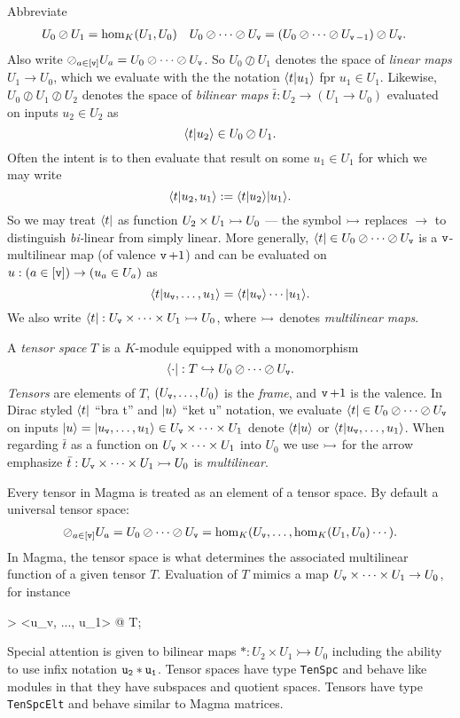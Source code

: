 \documentclass{documentation}
\begin{document}
Abbreviate 
\begin{align*}
   U_0\oslash U_1 & = \hom_K(U_1,U_0)
   &
   U_0\oslash\cdots \oslash U_{\operatorname{\mathtt{v}}} & = (U_0\oslash\cdots\oslash U_{\operatorname{\mathtt{v}}-1})\oslash U_{\operatorname{\mathtt{v}}}.
\end{align*}
Also write $\oslash_{a\in[\operatorname{\mathtt{v}}]} U_a=U_0\oslash\cdots\oslash
U_{\operatorname{\mathtt{v}}}$.  So $U_0\oslash U_1$ denotes the space of \emph{linear maps} $U_1\to U_0$,
which we evaluate with the the notation $\langle t|u_1\rangle$ fpr $u_1\in U_1$.
Likewise, $U_0\oslash U_1\oslash U_2$ denotes the space of \emph{bilinear maps} 
$\bar{t}:U_2\to (U_1\to U_0)$ evaluated  on inputs $u_2\in U_2$ as
\[
   \langle t|u_2\rangle \in U_0\oslash U_1.
\]
Often the intent is to then evaluate that result on some $u_1\in U_1$ for which we may 
write 
\[
   \langle t|u_2,u_1\rangle := \langle t| u_2\rangle |u_1\rangle.
\]
So we may treat $\langle t|$ as function $U_2\times U_1\rightarrowtail U_0$ --- the symbol $\rightarrowtail$
replaces $\to$ to distinguish \emph{bi-}linear from simply linear.  More generally, 
$\langle t|\in U_0\oslash\cdots\oslash U_{\operatorname{\mathtt{v}}}$ is a $\operatorname{\mathtt{v}}$-multilinear map 
(of valence $\operatorname{\mathtt{v}}+1$) and can be evaluated  on $u:(a\in [\operatorname{\mathtt{v}}])\to (u_a\in U_a)$
as 
\[
   \langle t|u_{\operatorname{\mathtt{v}}},\ldots,u_1\rangle = \langle t|u_{\operatorname{\mathtt{v}}}\rangle\cdots |u_1\rangle.
\]
We also write $\langle t|:U_{\operatorname{\mathtt{v}}}\times\cdots\times U_1\rightarrowtail U_0$, where $\rightarrowtail$ denotes 
\emph{multilinear maps}.

A \emph{tensor space} $T$ is a $K$-module equipped with a monomorphism 
\[ 
   \langle \cdot| : T \hookrightarrow U_0\oslash \cdots\oslash U_{\operatorname{\mathtt{v}}}.
\] 
\emph{Tensors}
are elements of $T$, $(U_{\operatorname{\mathtt{v}}},\dots,U_0)$ is the \emph{frame}, and $\operatorname{\mathtt{v}}+1$ is
the valence. In Dirac styled $\langle t|$ ``bra t'' and $| u\rangle$ ``ket u''
notation, we evaluate $\langle t|\in U_0\oslash \cdots\oslash U_{\operatorname{\mathtt{v}}}$ on inputs
$| u\rangle=| u_{\operatorname{\mathtt{v}}},\dots, u_1\rangle\in U_{\operatorname{\mathtt{v}}}\times\cdots\times U_1$ denote
$\langle t|u\rangle$ or $\langle t| u_{\operatorname{\mathtt{v}}},\dots,u_1\rangle$.  When regarding $\bar{t}$
as a function on $U_{\operatorname{\mathtt{v}}}\times\cdots\times U_1$ into $U_0$ we use $\rightarrowtail$ for the 
arrow emphasize $\bar{t}:U_{\operatorname{\mathtt{v}}}\times\cdots\times U_1\rightarrowtail U_0$ is \emph{multilinear}.


Every tensor in Magma is treated as an element
of a tensor space. By default a universal tensor space:
\begin{align*}
   \oslash_{a\in[\operatorname{\mathtt{v}}]} U_a = U_0\oslash \cdots\oslash U_{\operatorname{\mathtt{v}}}
   = \hom_K(U_{\operatorname{\mathtt{v}}},\dots,\hom_K(U_1,U_0)\cdots).
\end{align*} 
In Magma, the tensor space is what determines the associated
multilinear function of a given tensor $T$.  
Evaluation of $T$ mimics a map
$U_{\operatorname{\mathtt{v}}}\times \cdots \times U_1\to U_0$, for instance
\begin{code}
> <u_v, ..., u_1> @ T;
\end{code}
Special attention is given to bilinear maps 
$*:U_2\times U_1\rightarrowtail U_0$
including the ability to use infix notation ${\tt u_2*u_1}$.
Tensor spaces have type {\tt TenSpc} and behave like modules 
in that they have subspaces and quotient spaces.  Tensors have type 
{\tt TenSpcElt} and behave similar to Magma matrices.
\end{document}
